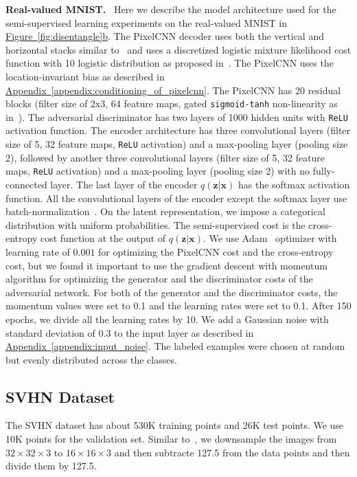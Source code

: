 \documentclass{article}
\newcommand{\myfigg}[2]{\hyperref[fig:#1]{Figure~\ref*{fig:#1}#2}}
\newcommand{\myappendix}[1]{\hyperref[appendix:#1]{Appendix~\ref*{appendix:#1}}}
\DeclareRobustCommand{\parhead}[1]{\textbf{#1}~}
\begin{document}
\begin{appendices}
\parhead{Real-valued MNIST.} 
Here we describe the model architecture used for the semi-supervised learning experiments on the real-valued MNIST in \myfigg{disentangle}{b}.
The PixelCNN decoder uses both the vertical and horizontal stacks similar to~\citep{pixelcnn} and uses a discretized logistic mixture likelihood cost function with 10 logistic distribution as proposed in~\citep{pixelcnn++}.
The PixelCNN uses the location-invariant bias as described in \myappendix{conditioning_of_pixelcnn}.
The PixelCNN has 20 residual blocks (filter size of 2x3, 64 feature maps, gated \texttt{sigmoid-tanh} non-linearity as in~\citep{pixelcnn}). 
The adversarial discriminator has two layers of 1000 hidden units with \texttt{ReLU} activation function. 
The encoder architecture has three convolutional layers (filter size of 5, 32 feature maps, \texttt{ReLU} activation) and a max-pooling layer (pooling size 2), followed by another three convolutional layers (filter size of 5, 32 feature maps, \texttt{ReLU} activation) and a max-pooling layer (pooling size 2) with no fully-connected layer.
The last layer of the encoder $q(\mathbf{z}|\mathbf{x})$ has the softmax activation function. All the convolutional layers of the encoder except the softmax layer use batch-normalization~\citep{batch}. 
On the latent representation, we impose a categorical distribution with uniform probabilities. 
The semi-supervised cost is the cross-entropy cost function at the output of $q(\mathbf{z}|\mathbf{x})$. We use Adam~\citep{Adam} optimizer with learning rate of $0.001$ for optimizing the PixelCNN cost and the cross-entropy cost, but we found it important to use the gradient descent with momentum algorithm for optimizing the generator and the discriminator costs of the adversarial network. 
For both of the generator and the discriminator costs, the momentum values were set to 0.1 and the learning rates were set to 0.1. After 150 epochs, we divide all the learning rates by 10.
We add a Gaussian noise with standard deviation of $0.3$ to the input layer as described in \myappendix{input_noise}. 
The labeled examples were chosen at random but evenly distributed across the classes.







\subsection{SVHN Dataset}\label{appendix:svhn}
The SVHN dataset has about 530K training points and 26K test points. We use 10K points for the validation set.
Similar to~\citep{vat}, we downsample the images from $32 \times 32 \times 3$ to $16 \times 16 \times 3$ and then subtracte 127.5 from the data points and then divide them by 127.5. 


\end{appendices}
\end{document}
